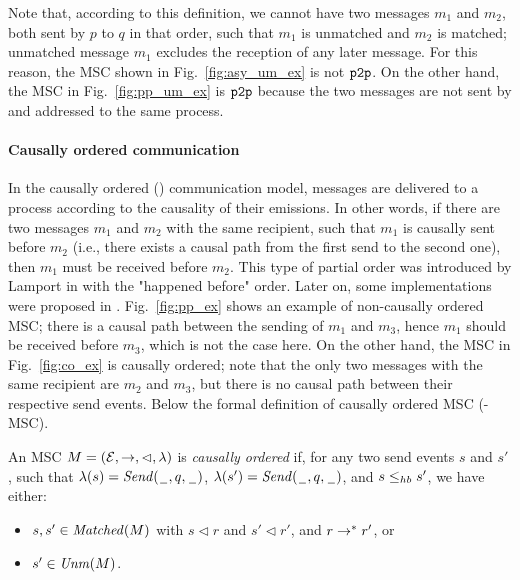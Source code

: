 Note that, according to this definition, we cannot have two messages $m_1$ and $m_2$, both sent by  $p$ to $q$ in that order, such that $m_1$ is unmatched and $m_2$ is matched;  unmatched message $m_1$ excludes the reception of any later message. For this reason, the MSC shown in Fig.~\ref{fig:asy_um_ex} is not $\mathtt{p2p}$. On the other hand, the MSC in Fig.~\ref{fig:pp_um_ex} is $\mathtt{p2p}$ because the two messages are not sent by and addressed to the same process.

\paragraph{\bf  Causally ordered communication}
In the causally ordered (\co) communication model, messages are delivered to a process according to the causality of their emissions. In other words, if there are two messages $m_1$ and $m_2$ with the same recipient, such that $m_1$ is causally sent before $m_2$ (i.e., there exists a causal path from the first send to the second one), then $m_1$ must be received before $m_2$.
This type of partial order was introduced by Lamport in \cite{Lamport78} with the "happened before" order. Later on, some implementations were proposed in \cite{peterson1989preserving, DBLP:conf/wdag/SchiperES89, kshemkalyani1998necessary}. %
Fig.~\ref{fig:pp_ex} shows an example of non-causally ordered MSC; there is a causal path between the sending of $m_1$ and $m_3$, hence $m_1$ should be received before $m_3$, which is not the case here. On the other hand, the MSC in Fig.~\ref{fig:co_ex} is causally ordered; note that the only two messages with the same recipient are $m_2$ and $m_3$, but there is no causal path between their respective send events. Below the formal definition of causally ordered MSC (\co-MSC).

\begin{definition}[\co-MSC]\label{def:co_msc}
	An MSC $M = (\mathcal{E},\to,\lhd,\lambda)$ is \emph{causally ordered} if, for any two send events $s$ and $s'$, such that $\lambda(s)={\mathit{Send}(\hspace{0.1em}\underline{\hspace{0.5em}}\hspace{0.1em},q,\hspace{0.1em}\underline{\hspace{0.5em}}\hspace{0.1em})}$, $\lambda(s')={\mathit{Send}(\hspace{0.1em}\underline{\hspace{0.5em}}\hspace{0.1em},q,\hspace{0.1em}\underline{\hspace{0.5em}}\hspace{0.1em})}$, and $s \leq_{hb} s'$, we have either:
	\begin{itemize}%
		\item $s,s' \in \mathit{Matched}(M)$ with  $s \lhd r$ and $s' \lhd r'$, and $r \to^* r'$, or %
		\item $s' \in \mathit{Unm}(M)$.
	\end{itemize}
\end{definition}


